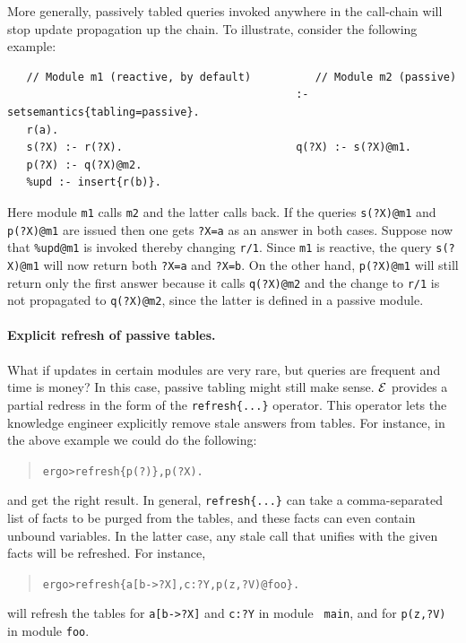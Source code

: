\documentclass[11pt]{article}
\newcommand{\ERGO}{\mbox{\ensuremath{\cal{E}}\smaller{{\sc{RGO}}}}\xspace}
\newcommand{\FLSYSTEM}{\ERGO}
\newcommand{\prompt}{ergo> }
\begin{document}
More generally, passively tabled queries invoked anywhere in the call-chain
will stop update propagation
up the chain. To illustrate, consider the following example:
\begin{verbatim}
   // Module m1 (reactive, by default)          // Module m2 (passive)
                                             :- setsemantics{tabling=passive}.
   r(a).                                     
   s(?X) :- r(?X).                           q(?X) :- s(?X)@m1.
   p(?X) :- q(?X)@m2.
   %upd :- insert{r(b)}.
\end{verbatim}
Here module \texttt{m1}  calls \texttt{m2} and the latter calls back. If
the queries \texttt{s(?X)@m1} and
\texttt{p(?X)@m1} are issued then one gets \texttt{?X=a} as an
answer in both cases. Suppose now that \texttt{\%upd@m1} is invoked thereby changing
\texttt{r/1}. Since \texttt{m1} is reactive, the query \texttt{s(?X)@m1}
will now return both \texttt{?X=a} and \texttt{?X=b}. On the other hand,
\texttt{p(?X)@m1} will still return only the first answer because it calls
\texttt{q(?X)@m2} and the change to \texttt{r/1} is not propagated to
\texttt{q(?X)@m2}, since the latter is defined in a passive module. 



\paragraph{Explicit refresh of passive tables.}
What if updates in certain modules are very rare, but queries are
frequent and time is money?
In this case, passive tabling might still make sense.
\FLSYSTEM provides a partial redress in the form of
the {\tt refresh\{...\}} operator. This operator
lets the knowledge engineer explicitly
remove stale answers from tables. For instance, in the above example we could
do the following:
\begin{quote}
\begin{alltt}
\prompt refresh\{p(?)\}, p(?X).
\end{alltt}
\end{quote}
and get the right result.
In general, {\tt refresh\{...\}} can take a comma-separated list of facts to
be purged from the tables, and these facts can even contain unbound variables.
In the latter case, any stale call that unifies with the given facts will
be refreshed. For instance,
\begin{quote}
\begin{alltt}
\prompt refresh\{a[b->?X], c:?Y, p(z,?V)@foo\}.
\end{alltt}
\end{quote}
will refresh the tables for {\tt a[b->?X]} and {\tt c:?Y} in module {\tt
  main}, and for {\tt p(z,?V)} in module {\tt foo}.
\end{document}
